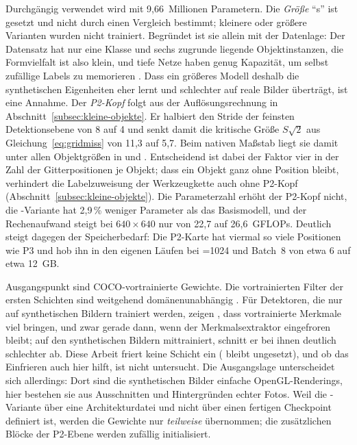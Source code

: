  Durchgängig verwendet wird  mit
9,66~Millionen Parametern. Die \emph{Größe} \enquote{s} ist gesetzt und nicht
durch einen Vergleich bestimmt; kleinere oder größere Varianten wurden nicht
trainiert. Begründet ist sie allein mit der Datenlage: Der Datensatz hat nur
eine Klasse und sechs zugrunde liegende Objektinstanzen, die Formvielfalt ist
also klein, und tiefe Netze haben genug Kapazität, um selbst zufällige Labels
zu memorieren \parencite{zhang2017rethinking}. Dass ein größeres Modell
deshalb die synthetischen Eigenheiten eher lernt und schlechter auf reale Bilder
überträgt, ist eine Annahme. Der \emph{P2-Kopf} folgt aus der
Auflösungsrechnung in Abschnitt~\ref{subsec:kleine-objekte}. Er halbiert den
Stride der feinsten Detektionsebene von 8 auf 4 und senkt damit die kritische Größe
$S\sqrt{2}$ aus Gleichung~\eqref{eq:gridmiss} von 11,3 auf 5,7\px. Beim nativen
Maßstab liegt sie damit unter allen Objektgrößen in  und .
Entscheidend ist dabei der Faktor vier in der Zahl der Gitterpositionen je
Objekt; dass ein Objekt ganz ohne Position bleibt, verhindert die
Labelzuweisung der Werkzeugkette auch ohne P2-Kopf
(Abschnitt~\ref{subsec:kleine-objekte}). Die Parameterzahl erhöht der P2-Kopf
nicht, die -Variante hat 2,9\,\% weniger Parameter als das
Basismodell, und der Rechenaufwand steigt bei $640\times640$ nur von 22,7 auf
26,6~GFLOPs. Deutlich steigt dagegen der Speicherbedarf: Die P2-Karte hat
viermal so viele Positionen wie P3 und hob ihn in den eigenen Läufen bei
=1024 und Batch~8 von etwa 6 auf etwa 12~GB.

Ausgangspunkt sind COCO-vortrainierte Gewichte. Die vortrainierten Filter der
ersten Schichten sind weitgehend domänenunabhängig \parencite{yosinski2014}.
Für Detektoren, die nur auf synthetischen Bildern trainiert werden, zeigen
\textcite{hinterstoisser2018}, dass vortrainierte Merkmale viel bringen, und zwar
gerade dann, wenn der Merkmalsextraktor eingefroren bleibt; auf den
synthetischen Bildern mittrainiert, schnitt er bei ihnen deutlich schlechter ab.
Diese Arbeit friert keine Schicht ein ( bleibt ungesetzt), und ob
das Einfrieren auch hier hilft, ist nicht untersucht. Die Ausgangslage
unterscheidet sich allerdings: Dort sind die synthetischen Bilder einfache
OpenGL-Renderings, hier bestehen sie aus Ausschnitten und Hintergründen echter
Fotos. Weil die -Variante über eine
Architekturdatei und nicht über einen fertigen Checkpoint definiert ist, werden
die Gewichte nur \emph{teilweise} übernommen; die zusätzlichen Blöcke der
P2-Ebene werden zufällig initialisiert.

